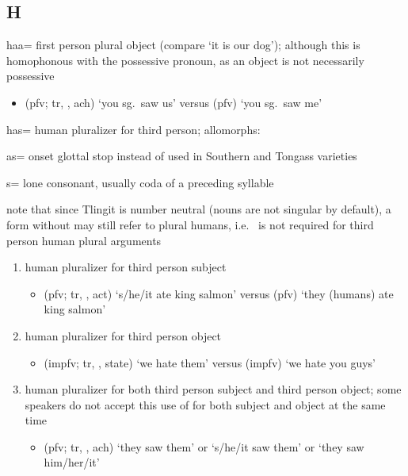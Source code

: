 \subsection{H}\label{sec:alphalist-h}
\begin{morphdesc}[resume*=alphalist]
\item[haa=]
	first person plural object
	(compare  ‘it is our dog’);
	although this is homophonous with the possessive pronoun,
		 as an object is not necessarily possessive
	\begin{itemize}
	\item	{} (pfv; tr, , ach) ‘you sg.\ saw us’\newline
		versus  (pfv) ‘you sg.\ saw me’
	\end{itemize}

\item[has=]
	human pluralizer for third person;
	\newline
	allomorphs:
	\begin{allolist}
	\item[as=]	onset glottal stop instead of  used in Southern and Tongass varieties
	\item[s=]	lone consonant, usually coda of a preceding syllable
	\end{allolist}
	note that since Tlingit is number neutral (nouns are not singular by default),
		a form without  may still refer to plural humans,
		i.e.\  is not required for third person human plural arguments
	\begin{enumerate}
	\item	human pluralizer for third person subject
		\begin{itemize}
		\item	{} (pfv; tr, ,  act) ‘s/he/it ate king salmon’\newline
			versus  (pfv) ‘they (humans) ate king salmon’
		\end{itemize}
	\item	human pluralizer for third person object
		\begin{itemize}
		\item	{} (impfv; tr, ,  state) ‘we hate them’\newline
			versus  (impfv) ‘we hate you guys’
		\end{itemize}
	\item	human pluralizer for both third person subject and third person object;
		some speakers do not accept this use of 
			for both subject and object at the same time
		\begin{itemize}
		\item	{} (pfv; tr, , ach) ‘they saw them’
			or ‘s/he/it saw them’ or ‘they saw him/her/it’
		\end{itemize}
	\end{enumerate}
\end{morphdesc}


